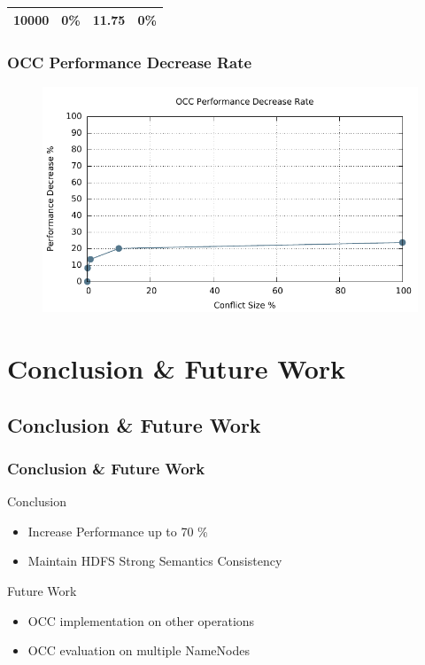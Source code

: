 \documentclass{beamer}
\begin{document}
\begin{frame}
\begin{table}[ht]
\begin{tabular}{|c|c|c|c|}
			10000                                                                                                          & 0\%                                                               & 11.75                                                                     & 0\%                                                                                               \\ \hline
		\end{tabular}
	\end{table}
\end{frame}
\begin{frame}
	\frametitle{OCC Performance Decrease Rate}
	\begin{figure}[ht]
		\centering
		\includegraphics[width=\linewidth]{figs/conRate.pdf}
	\end{figure}
\end{frame}

\section{Conclusion \& Future Work}
\subsection{Conclusion \& Future Work}
\begin{frame}
	\frametitle{Conclusion \& Future Work}
	\begin{block}{Conclusion}
		\begin{itemize}
			\item Increase Performance up to 70 \%
			\item Maintain HDFS Strong Semantics Consistency
		\end{itemize}
	\end{block}
	\begin{block}{Future Work}
				\begin{itemize}
					\item OCC implementation on other operations
					\item OCC evaluation on multiple NameNodes
				\end{itemize}
	\end{block}
\end{frame}
\end{document}
